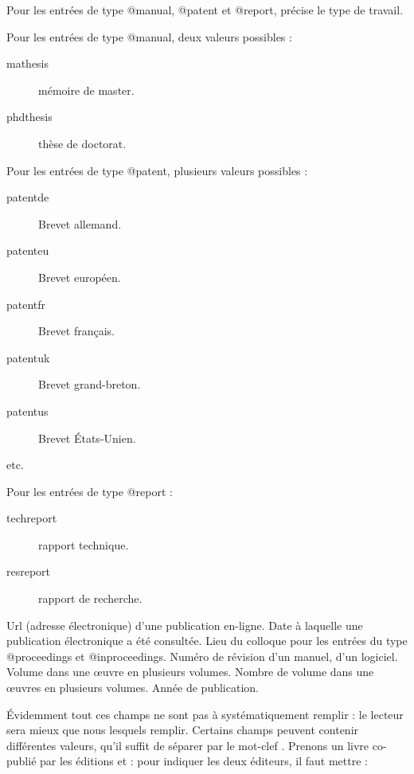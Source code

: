 \begin{fieldlist}
					
   	 Pour les entrées de type  @manual, @patent et @report, précise le type de travail.
	
	 Pour les entrées de type @manual, deux valeurs possibles :
					\begin{description}
						\item[mathesis]mémoire de master.
						\item[phdthesis]thèse de doctorat.
					\end{description}
					
					 Pour les entrées de type @patent, plusieurs  valeurs possibles : 
					 
					 
					 \begin{description}
						\item[patentde] Brevet allemand.
						\item[patenteu] Brevet européen.
						\item[patentfr] Brevet français.
						\item[patentuk] Brevet grand-breton.
						\item[patentus] Brevet États-Unien.
						\item[etc.]
					 \end{description}
					
					Pour les entrées de type @report : 
					\begin{description}
						\item[techreport]rapport technique.
						\item[resreport]rapport de recherche.
					\end{description}
					
	 Url (adresse électronique) d'une publication en-ligne. 
   	 Date à laquelle une publication électronique a été consultée. 
   	 Lieu du colloque pour les entrées du type @proceedings et @inproceedings. 
   	 Numéro de révision d'un manuel, d'un logiciel. 
   	 Volume dans une œuvre en plusieurs volumes. 
   	 Nombre de volume dans une œuvres en plusieurs volumes. 
   	 Année de publication. 				
\end{fieldlist}


Évidemment tout ces champs ne sont pas à systématiquement remplir : le lecteur sera mieux que nous lesquels remplir. Certains champs peuvent contenir différentes valeurs, qu'il suffit de séparer par le mot-clef . Prenons un livre co-publié par les éditions  et  : pour indiquer les deux éditeurs, il faut mettre :

